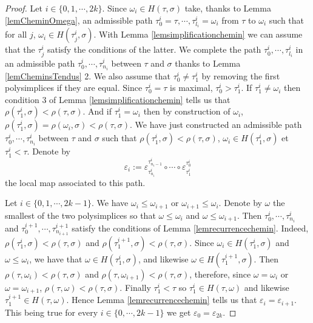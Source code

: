\documentclass[a4paper,10pt]{amsart}
\begin{document}
\begin{proof}
\bigskip


Let $i \in \{0,1,\cdots,2k\}$. Since $\omega_{i} \in H(\tau,\sigma)$ take, thanks to Lemma \ref{lemCheminOmega}, an admissible path $\tau_{0}^{i}=\tau,\cdots,\tau_{l_{i}}^{i}=\omega_{i}$ from $\tau$ to $\omega_{i}$ such that for all $j$, $\omega_{i} \in H(\tau_{j}^{i},\sigma)$. With Lemma \ref{lemsimplificationchemin} we can assume that the $\tau_{j}^{i}$ satisfy the conditions of the latter. We complete the path $\tau_{0}^{i},\cdots,\tau_{l_{i}}^{i}$ in an admissible path $\tau_{0}^{i},\cdots,\tau_{n_{i}}^{i}$ between $\tau$ and $\sigma$ thanks to Lemma \ref{lemCheminsTendus} 2. We also assume that $\tau_{0}^{i} \neq \tau_{1}^{i}$ by removing the first polysimplices if they are equal. Since $\tau_{0}^{i}=\tau$ is maximal, $\tau_{0}^{i} > \tau_{1}^{i}$. If $\tau_{1}^{i} \neq \omega_{i}$ then condition 3 of Lemma \ref{lemsimplificationchemin} tells us that $\rho(\tau_{1}^{i},\sigma)<\rho(\tau,\sigma)$. And if $\tau_{1}^{i} = \omega_{i}$ then by construction of $\omega_{i}$, $\rho(\tau_{1}^{i},\sigma)=\rho(\omega_{i},\sigma)<\rho(\tau,\sigma)$. We have just constructed an admissible path $\tau_{0}^{i},\cdots,\tau_{n_{i}}^{i}$ between $\tau$ and $\sigma$ such that $\rho(\tau_{1}^{i},\sigma) < \rho(\tau,\sigma)$, $\omega_{i} \in H(\tau_{1}^{i},\sigma)$ et $\tau_{1}^{i} < \tau$. Denote by
\[\varepsilon_i:=\varepsilon^{\tau_{n_{i}-1}^{i}}_{\tau_{n_{i}}^{i}} \circ \cdots \circ \varepsilon_{\tau_{1}^{i}}^{\tau_{0}^{i}}\]
the local map associated to this path.

\bigskip

Let $i \in \{0,1,\cdots,2k-1\}$. We have $\omega_{i} \leq \omega_{i+1}$ or $\omega_{i+1} \leq \omega_{i}$. Denote by $\omega$ the smallest of the two polysimplices so that $\omega \leq \omega_{i}$ and $\omega \leq \omega_{i+1}$. Then $\tau_{0}^{i},\cdots,\tau_{n_{i}}^{i}$ and $\tau_{0}^{i+1},\cdots,\tau_{n_{i+1}}^{i+1}$ satisfy the conditions of Lemma \ref{lemrecurrencechemin}. Indeed, $\rho(\tau_{1}^{i},\sigma) < \rho(\tau,\sigma)$ and $\rho(\tau_{1}^{i+1},\sigma) < \rho(\tau,\sigma)$. Since $\omega_{i} \in H(\tau_{1}^{i},\sigma)$ and $\omega \leq \omega_{i}$, we have that $\omega \in H(\tau_{1}^{i},\sigma)$, and likewise $\omega \in H(\tau_{1}^{i+1},\sigma)$. Then $\rho(\tau,\omega_{i})<\rho(\tau,\sigma)$ and $\rho(\tau,\omega_{i+1})<\rho(\tau,\sigma)$, therefore, since $\omega=\omega_{i}$ or $\omega=\omega_{i+1}$, $\rho(\tau,\omega)<\rho(\tau,\sigma)$. Finally $\tau_{1}^{i} < \tau$ so $\tau_{1}^{i} \in H(\tau,\omega)$ and likewise $\tau_{1}^{i+1} \in H(\tau,\omega)$. Hence Lemma \ref{lemrecurrencechemin} tells us that $\varepsilon_i=\varepsilon_{i+1}$. This being true for every $i \in \{0,\cdots,2k-1\}$ we get $\varepsilon_0=\varepsilon_{2k}$.


\end{proof}
\end{document}
